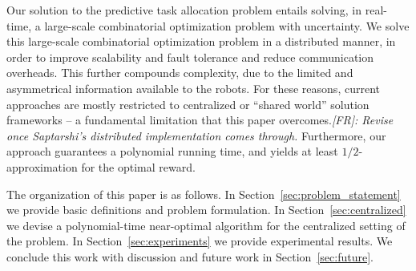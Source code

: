 \documentclass[conference]{IEEEtran}
\newcommand{\frline}[2]{{\color{blue}#1}{\em \color{blue}[FR]: #2}}
\newcommand{\frline}[2]{#1}
\begin{document}
Our solution to the predictive task allocation problem entails solving, in real-time, a large-scale combinatorial optimization problem with uncertainty. We solve this large-scale combinatorial optimization problem in a distributed manner, in order to improve scalability and fault tolerance and reduce communication overheads. This further compounds complexity, due to the limited and asymmetrical information available to the robots. \frline{For these reasons, current approaches are mostly restricted to centralized or “shared world” solution frameworks -- a fundamental limitation that this paper overcomes.}{Revise once Saptarshi's distributed implementation comes through.} Furthermore, our approach guarantees a polynomial running time, and yields at least $1/2$-approximation for the optimal reward. 

The organization of this paper is as follows. In Section~\ref{sec:problem_statement} we provide basic definitions and problem formulation. In Section~\ref{sec:centralized} we devise a polynomial-time near-optimal algorithm for the centralized setting of the problem. %
In Section~\ref{sec:experiments} we provide experimental results. We conclude this work with discussion and future work in Section~\ref{sec:future}.
\end{document}
